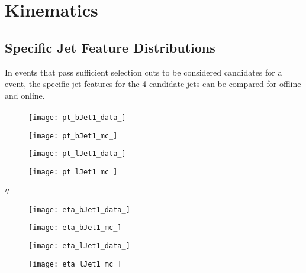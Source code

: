 \chapter{Kinematics}\label{c:K}

\section{Specific Jet Feature Distributions}

	In events that pass sufficient selection cuts to be considered candidates for a \VBFHBB event, the specific jet features for the 4 candidate jets can be compared for offline and online.
	
		\subsubsection{\pt}
		
			\begin{figure}[h]
				\centering
				
				\begin{minipage}[h]{0.33\linewidth}
					\texttt{[image: pt\_bJet1\_data\_]}
				\end{minipage}
				\quad
				\begin{minipage}[h]{0.33\linewidth}
					\texttt{[image: pt\_bJet1\_mc\_]}
				\end{minipage}

				\begin{minipage}[h]{0.33\linewidth}
					\texttt{[image: pt\_lJet1\_data\_]}
				\end{minipage}
				\quad
				\begin{minipage}[h]{0.33\linewidth}
					\texttt{[image: pt\_lJet1\_mc\_]}
				\end{minipage}
				\label{fig:kin:pt2c4j}
			\end{figure}	
			
	
			\subsubsection{$\eta$}
				
				\begin{figure}[h]
					\centering
					
					\begin{minipage}[h]{0.33\linewidth}
						\texttt{[image: eta\_bJet1\_data\_]}
					\end{minipage}
					\quad
					\begin{minipage}[h]{0.33\linewidth}
						\texttt{[image: eta\_bJet1\_mc\_]}
					\end{minipage}
					
					\begin{minipage}[h]{0.33\linewidth}
						\texttt{[image: eta\_lJet1\_data\_]}
					\end{minipage}
					\quad
					\begin{minipage}[h]{0.33\linewidth}
						\texttt{[image: eta\_lJet1\_mc\_]}
					\end{minipage}
					\label{fig:kin:eta2c4j}
				\end{figure}


